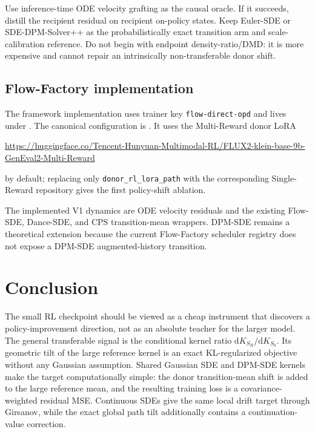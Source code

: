 \documentclass[11pt,a4paper]{article}
\newcommand{\dd}{\mathrm{d}}
\newcommand{\Sbase}{S_0}
\newcommand{\Srl}{S_R}
\theoremstyle{plain}
\theoremstyle{definition}
\begin{document}
\begin{tcolorbox}[colback=gray!5,colframe=gray!55,title=Recommended first implementation]
Use inference-time ODE velocity grafting as the causal oracle.  If it succeeds, distill the
recipient residual on recipient on-policy states.  Keep Euler-SDE or SDE-DPM-Solver++ as the
probabilistically exact transition arm and scale-calibration reference.  Do not begin with
endpoint density-ratio/DMD: it is more expensive and cannot repair an intrinsically
non-transferable donor shift.
\end{tcolorbox}

\subsection{Flow-Factory implementation}

The framework implementation uses trainer key
\texttt{flow-direct-opd} and lives under
.  The canonical configuration is
.  It uses the Multi-Reward donor LoRA
\begin{center}
\small
\url{https://huggingface.co/Tencent-Hunyuan-Multimodal-RL/FLUX2-klein-base-9b-GenEval2-Multi-Reward}
\end{center}
by default; replacing only \texttt{donor\_rl\_lora\_path} with the corresponding Single-Reward
repository gives the first policy-shift ablation.

The implemented V1 dynamics are ODE velocity residuals and the existing Flow-SDE, Dance-SDE, and
CPS transition-mean wrappers.  DPM-SDE remains a theoretical extension because the current
Flow-Factory scheduler registry does not expose a DPM-SDE augmented-history transition.

\section{Conclusion}
\label{sec:conclusion}

The small RL checkpoint should be viewed as a cheap instrument that discovers a policy-improvement
direction, not as an absolute teacher for the larger model.  The general transferable signal is
the conditional kernel ratio $\dd K_{\Srl}/\dd K_{\Sbase}$.  Its geometric tilt of the large
reference kernel is an exact KL-regularized objective without any Gaussian assumption.  Shared
Gaussian SDE and DPM-SDE kernels make the target computationally simple: the donor transition-mean
shift is added to the large reference mean, and the resulting training loss is a covariance-weighted
residual MSE.  Continuous SDEs give the same local drift target through Girsanov, while the exact
global path tilt additionally contains a continuation-value correction.
\end{document}
